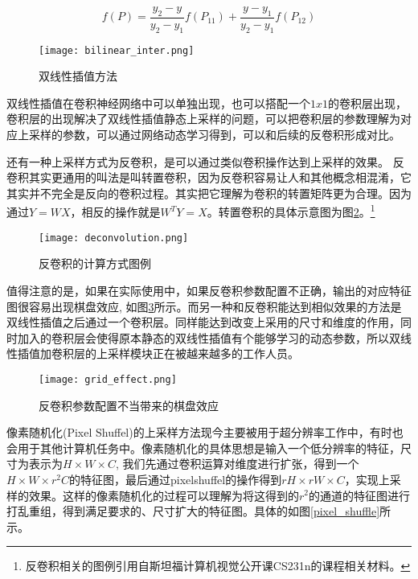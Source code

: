 \documentclass[master]{thesis-uestc}
\begin{document}
\begin{equation}
    f(P) =  \frac{y_2 - y }{y_2 - y_1} f(P_{11})  + \frac{y - y_1 }{y_2 - y_1} f(P_{12})
\end{equation}

\begin{figure}[h]\centering
    \texttt{[image: bilinear\_inter.png]}
    \caption{双线性插值方法}
    \label{bilinear}
\end{figure}

双线性插值在卷积神经网络中可以单独出现，也可以搭配一个$1x1$的卷积层出现，卷积层的出现解决了双线性插值静态上采样的问题，可以把卷积层的参数理解为对应上采样的参数，可以通过网络动态学习得到，可以和后续的反卷积形成对比。

还有一种上采样方式为反卷积，是可以通过类似卷积操作达到上采样的效果。
反卷积其实更通用的叫法是叫转置卷积，因为反卷积容易让人和其他概念相混淆，它其实并不完全是反向的卷积过程。其实把它理解为卷积的转置矩阵更为合理。因为通过$Y = WX$，相反的操作就是$W^TY = X$。转置卷积的具体示意图为图\ref{deconv}。\footnote{反卷积相关的图例引用自斯坦福计算机视觉公开课CS231n的课程相关材料。}
\begin{figure}[h]
    \centering
    \texttt{[image: deconvolution.png]}
    \caption{反卷积的计算方式图例}
    \label{deconv}
\end{figure}

值得注意的是，如果在实际使用中，如果反卷积参数配置不正确，输出的对应特征图很容易出现棋盘效应, 如图\ref{grid_effect}所示。而另一种和反卷积能达到相似效果的方法是双线性插值之后通过一个卷积层。同样能达到改变上采用的尺寸和维度的作用，同时加入的卷积层会使得原本静态的双线性插值有个能够学习的动态参数，所以双线性插值加卷积层的上采样模块正在被越来越多的工作人员。

\begin{figure}[hb!]
    \centering
    \texttt{[image: grid\_effect.png]}
    \caption{反卷积参数配置不当带来的棋盘效应}
    \label{grid_effect}
\end{figure}

像素随机化(Pixel Shuffel)的上采样方法现今主要被用于超分辨率工作中，有时也会用于其他计算机任务中。像素随机化的具体思想是输入一个低分辨率的特征，尺寸为表示为$H \times W \times C$, 我们先通过卷积运算对维度进行扩张，得到一个$H \times W \times r^2C$的特征图，最后通过pixelshuffel的操作得到$rH \times rW \times C$，实现上采样的效果。这样的像素随机化的过程可以理解为将这得到的$r^2$的通道的特征图进行打乱重组，得到满足要求的、尺寸扩大的特征图。具体的如图\ref{pixel_shuffle}所示。
\end{document}
